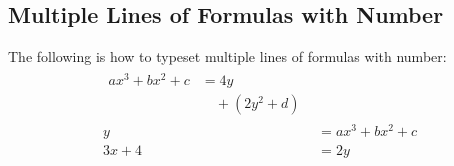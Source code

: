 \documentclass[a4paper, 12pt]{article} %
\begin{document}
	\subsection{Multiple Lines of Formulas with Number}
	The following is how to typeset multiple lines of formulas with number:
	\begin{align} %
		\begin{split} %
			ax^3+bx^2+c &= 4y\\
			&\quad +(2y^2+d)
		\end{split}\\
		y &= ax^3+bx^2+c\\
		3x+4 &= 2y
	\end{align}
\end{document}
